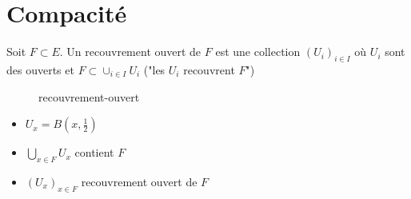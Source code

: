 \section{Compacité}
\begin{definition}
   Soit $F \subset E$. Un recouvrement ouvert de $F$ est une collection  $(U_i)_{i \in I}$ où $U_i$ sont des ouverts et $F \subset \cup_{i \in I} U_i$ ("les $U_i$ recouvrent  $F$")
\end{definition}
\begin{eg}
\begin{figure}[H]
    \centering
    \caption{recouvrement-ouvert}
    \label{fig:recouvrement-ouvert}
\end{figure}
\begin{itemize}
    \item $U_x = B(x, \frac{1}{2})$
    \item $\bigcup_{x \in F} U_x$ contient $F$
    \item  $(U_x)_{x \in F}$ recouvrement ouvert de $F$
\end{itemize}
\end{eg}

